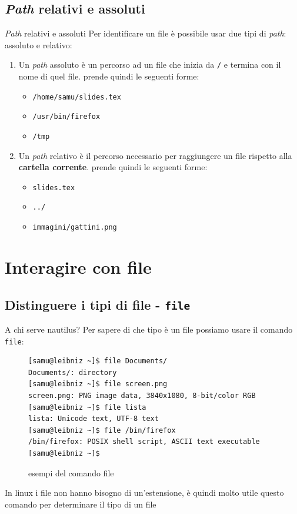 \documentclass{beamer}
\begin{document}
\subsection{\textit{Path} relativi e assoluti}
\begin{frame}{\textit{Path} relativi e assoluti}
  Per identificare un file è possibile usar due tipi di \textit{path}: assoluto 
  e relativo:
  \begin{enumerate}
    \item Un \textit{path} assoluto è un percorso ad un file che inizia da 
      \texttt{/} e termina con il nome di quel file. prende quindi le seguenti
      forme:
      \begin{itemize}
        \item \texttt{/home/samu/slides.tex}
        \item \texttt{/usr/bin/firefox}
        \item \texttt{/tmp}
      \end{itemize}
    \item Un \textit{path} relativo è il percorso necessario per raggiungere un
      file rispetto alla \textbf{cartella corrente}. prende quindi le seguenti
      forme:
      \begin{itemize}
        \item \texttt{slides.tex}
        \item \texttt{../}
        \item \texttt{immagini/gattini.png}
      \end{itemize}
  \end{enumerate}
\end{frame}

\section{Interagire con file}

  \subsection{Distinguere i tipi di file - \texttt{file}}
\begin{frame}[fragile]{A chi serve nautilus?}
  Per sapere di che tipo è un file possiamo usare il comando \texttt{file}:
  \begin{figure}
    \begin{lstlisting}[basicstyle=\footnotesize]
[samu@leibniz ~]$ file Documents/
Documents/: directory
[samu@leibniz ~]$ file screen.png
screen.png: PNG image data, 3840x1080, 8-bit/color RGB
[samu@leibniz ~]$ file lista
lista: Unicode text, UTF-8 text
[samu@leibniz ~]$ file /bin/firefox
/bin/firefox: POSIX shell script, ASCII text executable
[samu@leibniz ~]$
    \end{lstlisting}
    \caption{esempi del comando file}
  \end{figure}
  In linux i file non hanno bisogno di un'estensione, è quindi molto utile 
  questo comando per determinare il tipo di un file
\end{frame}
\end{document}
